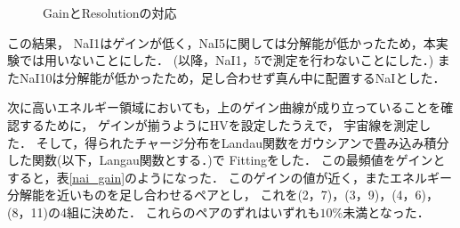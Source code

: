 \begin{figure}[H]
\begin{minipage}{0.45\hsize}
\begin{center}
    \end{center}
    \caption{GainとResolutionの対応}
    \label{resoHV}
  \end{minipage}
\end{figure}
この結果， NaI1はゲインが低く，NaI5に関しては分解能が低かったため，本実験では用いないことにした．
(以降，NaI1，5で測定を行わないことにした．)
またNaI10は分解能が低かったため，足し合わせず真ん中に配置するNaIとした．

次に高いエネルギー領域においても，上のゲイン曲線が成り立っていることを確認するために，
ゲインが揃うようにHVを設定したうえで， 宇宙線を測定した．
そして，得られたチャージ分布をLandau関数をガウシアンで畳み込み積分した関数(以下，Langau関数とする．)で
Fittingをした．
この最頻値をゲインとすると，表\ref{nai_gain}のようになった．
このゲインの値が近く，またエネルギー分解能を近いものを足し合わせるペアとし，
これを(2，7)，(3，9)，(4，6)，(8，11)の4組に決めた．
これらのペアのずれはいずれも$10\%$未満となった．

